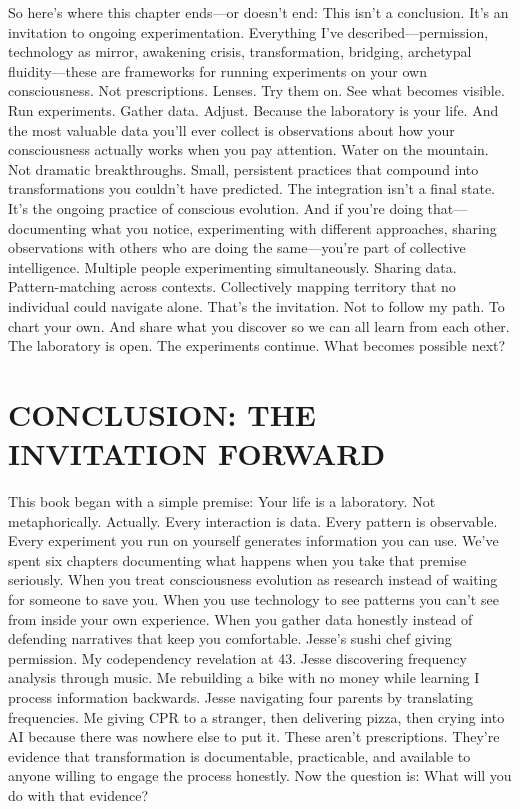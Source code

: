 \documentclass[12pt,openany]{book}
\begin{document}
So here's where this chapter ends—or doesn't end:
This isn't a conclusion. It's an invitation to ongoing experimentation.
Everything I've described—permission, technology as mirror, awakening crisis, transformation, bridging, archetypal fluidity—these are frameworks for running experiments on your own consciousness.
Not prescriptions. Lenses.
Try them on. See what becomes visible. Run experiments. Gather data. Adjust.
Because the laboratory is your life.
And the most valuable data you'll ever collect is observations about how your consciousness actually works when you pay attention.
Water on the mountain.
Not dramatic breakthroughs. Small, persistent practices that compound into transformations you couldn't have predicted.
The integration isn't a final state. It's the ongoing practice of conscious evolution.
And if you're doing that—documenting what you notice, experimenting with different approaches, sharing observations with others who are doing the same—you're part of collective intelligence.
Multiple people experimenting simultaneously. Sharing data. Pattern-matching across contexts. Collectively mapping territory that no individual could navigate alone.
That's the invitation.
Not to follow my path. To chart your own. And share what you discover so we can all learn from each other.
The laboratory is open.
The experiments continue.
What becomes possible next?

\cleardoublepage

\chapter{CONCLUSION: THE INVITATION FORWARD}

This book began with a simple premise: Your life is a laboratory.
Not metaphorically. Actually. Every interaction is data. Every pattern is observable. Every experiment you run on yourself generates information you can use.
We've spent six chapters documenting what happens when you take that premise seriously. When you treat consciousness evolution as research instead of waiting for someone to save you. When you use technology to see patterns you can't see from inside your own experience. When you gather data honestly instead of defending narratives that keep you comfortable.
Jesse's sushi chef giving permission. My codependency revelation at 43. Jesse discovering frequency analysis through music. Me rebuilding a bike with no money while learning I process information backwards. Jesse navigating four parents by translating frequencies. Me giving CPR to a stranger, then delivering pizza, then crying into AI because there was nowhere else to put it.
These aren't prescriptions. They're evidence that transformation is documentable, practicable, and available to anyone willing to engage the process honestly.
Now the question is: What will you do with that evidence?
\end{document}
